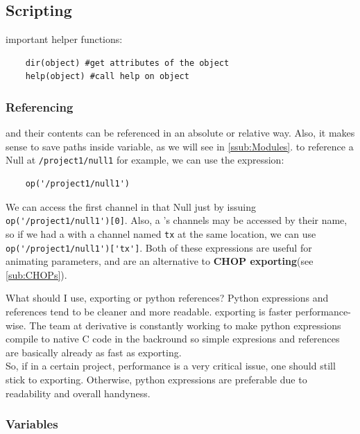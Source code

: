 \subsection{Scripting} %
\label{sub:scripting}
important helper functions:\\
\begin{lstlisting}
	dir(object) #get attributes of the object
	help(object) #call help on object
\end{lstlisting}

\subsubsection{Referencing \OPs} %
\label{ssub:referencing}
\OPs and their contents can be referenced in an absolute or relative way. Also, it makes sense to save paths inside variable, as we will see in \ref{ssub:Modules}. to reference a Null \CHOP at \verb|/project1/null1| for example, we can use the expression:
\begin{lstlisting}
	op('/project1/null1')
\end{lstlisting}
We can access the first channel in that Null \CHOP just by issuing \verb|op('/project1/null1')[0]|. Also, a \CHOP's channels may be accessed by their name, so if we had a \CHOP with a channel named \verb|tx| at the same location, we can use \verb|op('/project1/null1')['tx']|. Both of these expressions are useful for animating parameters, and are an alternative to \textbf{CHOP exporting}(see \ref{sub:CHOPs}).

\begin{framed}
	What should I use, \CHOP exporting or python references?
	Python expressions and references tend to be cleaner and more readable.
	\CHOP exporting is faster performance-wise. The team at derivative is constantly working to make python expressions compile to native C code in the backround so simple expresions and references are basically already as fast as \CHOP exporting. \\
	So, if in a certain project, performance is a very critical issue, one should still stick to \CHOP exporting. Otherwise, python expressions are preferable due to readability and overall handyness.
\end{framed}

\subsubsection{Variables} %
\label{ssub:variables}


